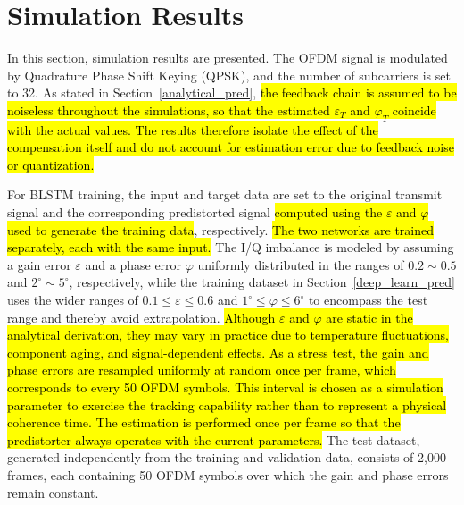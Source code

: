 \documentclass[lettersize,journal]{IEEEtran}
\begin{document}
\section{Simulation Results} \label{simulation}

In this section, simulation results are presented.
The OFDM signal is modulated by Quadrature Phase Shift Keying (QPSK), and the number of subcarriers is set to 32.
As stated in Section~\ref{analytical_pred}, \hl{the feedback chain is assumed to be noiseless throughout the simulations, so that the estimated $\varepsilon_T$ and $\varphi_T$ coincide with the actual values.
The results therefore isolate the effect of the compensation itself and do not account for estimation error due to feedback noise or quantization.}

For BLSTM training, the input and target data are set to the original transmit signal and the corresponding predistorted signal \hl{computed using the $\varepsilon$ and $\varphi$ used to generate the training data}, respectively.
\hl{The two networks are trained separately, each with the same input.}
The I/Q imbalance is modeled by assuming a gain error $\varepsilon$ and a phase error $\varphi$ uniformly distributed in the ranges of $0.2 \sim 0.5$ and $2^\circ \sim 5^\circ$, respectively, while the training dataset in Section~\ref{deep_learn_pred} uses the wider ranges of $0.1 \le \varepsilon \le 0.6$ and $1^\circ \le \varphi \le 6^\circ$ to encompass the test range and thereby avoid extrapolation.
\hl{Although $\varepsilon$ and $\varphi$ are static in the analytical derivation, they may vary in practice due to temperature fluctuations, component aging, and signal-dependent effects.
As a stress test, the gain and phase errors are resampled uniformly at random once per frame, which corresponds to every 50 OFDM symbols.
This interval is chosen as a simulation parameter to exercise the tracking capability rather than to represent a physical coherence time.
The estimation is performed once per frame so that the predistorter always operates with the current parameters.}
The test dataset, generated independently from the training and validation data, consists of 2,000 frames, each containing 50 OFDM symbols over which the gain and phase errors remain constant.
\end{document}
